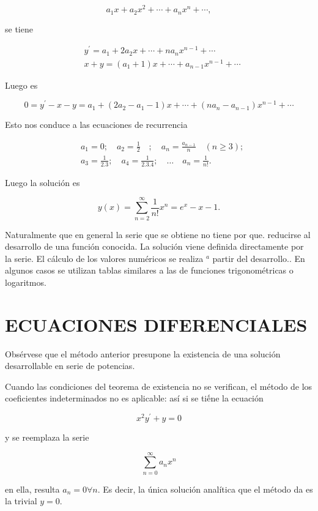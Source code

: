 \documentclass[10pt]{article}
\theoremstyle{plain}
\theoremstyle{definition}
\theoremstyle{remark}
\begin{document}
$$
a_{1} x+a_{2} x^{2}+\cdots+a_{n} x^{n}+\cdots,
$$

se tiene

$$
\begin{aligned}
& y^{\prime}=a_{1}+2 a_{2} x+\cdots+n a_{n} x^{n-1}+\cdots \\
& x+y=\left(a_{1}+1\right) x+\cdots+a_{n-1} x^{n-1}+\cdots
\end{aligned}
$$

Luego es

$$
0=y^{\prime}-x-y=a_{1}+\left(2 a_{2}-a_{1}-1\right) x+\cdots+\left(n a_{n}-a_{n-1}\right) x^{n-1}+\cdots
$$

Esto nos conduce a las ecuaciones de recurrencia

$$
\begin{aligned}
& a_{1}=0 ; \quad a_{2}=\frac{1}{2} \quad ; \quad a_{n}=\frac{a_{n-1}}{n} \quad(n \geqslant 3) ; \\
& a_{3}=\frac{1}{2.3} ; \quad a_{4}=\frac{1}{2.3 .4} ; \quad \ldots \quad a_{n}=\frac{1}{n!} .
\end{aligned}
$$

Luego la solución es

$$
y(x)=\sum_{n=2}^{\infty} \frac{1}{n!} x^{n}=e^{x}-x-1 .
$$

Naturalmente que en general la serie que se obtiene no tiene por que. reducirse al desarrollo de una función conocida. La solución viene definida directamente por la serie. El cálculo de los valores numéricos se realiza ${ }^{a}$ partir del desarrollo.. En algunos casos se utilizan tablas similares a las de funciones trigonométricas o logaritmos.

\section*{ECUACIONES DIFERENCIALES}
Obsérvese que el método anterior presupone la existencia de una solución desarrollable en serie de potencias.

Cuando las condiciones del teorema de existencia no se verifican, el método de los coeficientes indeterminados no es aplicable: así si se tiếne la ecuación

$$
x^{2} y^{\prime}+y=0
$$

y se reemplaza la serie

$$
\sum_{n=0}^{\infty} a_{n} x^{n}
$$

en ella, resulta $a_{n}=0 \forall n$. Es decir, la única solución analítica que el método da es la trivial $y=0$.
\end{document}
